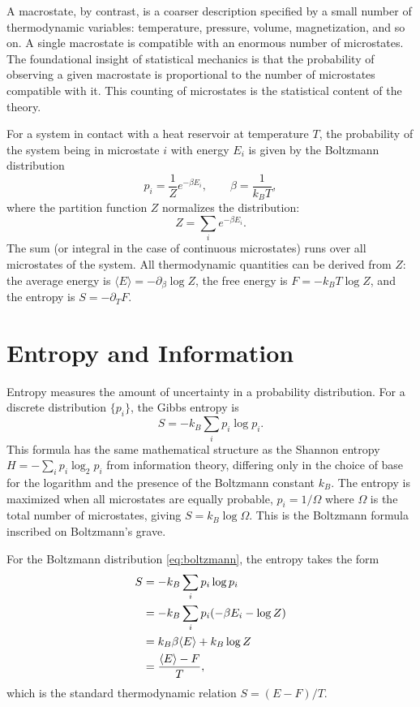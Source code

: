 \documentclass[11pt, twoside, openright]{book}
\theoremstyle{dotted}
\theoremstyle{definition}
\begin{document}
A macrostate, by contrast, is a coarser description specified by a small number
of thermodynamic variables: temperature, pressure, volume, magnetization, and so
on. A single macrostate is compatible with an enormous number of microstates.
The foundational insight of statistical mechanics is that the probability of
observing a given macrostate is proportional to the number of microstates
compatible with it. This counting of microstates is the statistical content of
the theory.

For a system in contact with a heat reservoir at temperature $T$, the probability
of the system being in microstate $i$ with energy $E_i$ is given by the
Boltzmann distribution
\begin{equation}
  p_i = \frac{1}{Z} e^{-\beta E_i}, \qquad \beta = \frac{1}{k_B T},
  \label{eq:boltzmann}
\end{equation}
where the partition function $Z$ normalizes the distribution:
\begin{equation}
  Z = \sum_i e^{-\beta E_i}.
  \label{eq:partition_function}
\end{equation}
The sum (or integral in the case of continuous microstates) runs over all
microstates of the system. All thermodynamic quantities can be derived from $Z$:
the average energy is $\langle E \rangle = -\partial_\beta \log Z$, the free
energy is $F = -k_BT \log Z$, and the entropy is $S = -\partial_T F$.

\section{Entropy and Information}

Entropy measures the amount of uncertainty in a probability distribution.
For a discrete distribution $\{p_i\}$, the Gibbs entropy is
\begin{equation}
  S = -k_B \sum_i p_i \log p_i.
  \label{eq:gibbs_entropy}
\end{equation}
This formula has the same mathematical structure as the Shannon entropy
$H = -\sum_i p_i \log_2 p_i$ from information theory, differing only in the
choice of base for the logarithm and the presence of the Boltzmann constant $k_B$.
The entropy is maximized when all microstates are equally probable, $p_i = 1/\Omega$
where $\Omega$ is the total number of microstates, giving $S = k_B \log \Omega$.
This is the Boltzmann formula inscribed on Boltzmann's grave.

For the Boltzmann distribution \eqref{eq:boltzmann}, the entropy takes the form
\begin{align}
  S &= -k_B \sum_i p_i \log p_i \notag \\
  &= -k_B \sum_i p_i (-\beta E_i - \log Z) \notag \\
  &= k_B\beta \langle E \rangle + k_B \log Z \notag \\
  &= \frac{\langle E \rangle - F}{T},
\end{align}
which is the standard thermodynamic relation $S = (E - F)/T$.
\end{document}
